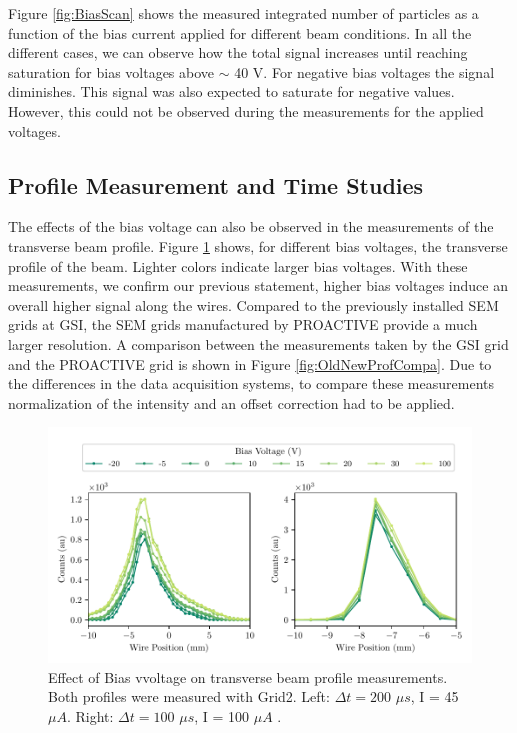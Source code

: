 Figure \ref{fig:BiasScan} shows the measured integrated number of particles as a function of the bias current applied for different beam conditions. In all the different cases, we can observe how the total signal increases until reaching saturation for bias voltages above $\sim$ 40 V. For negative bias voltages the signal diminishes. This signal was also expected to saturate for negative values. However, this could not be observed during the measurements for the applied voltages. 

\subsection{Profile Measurement and Time Studies}

The effects of the bias voltage can also be observed in the measurements of the transverse beam profile. Figure \ref{fig:BeamProfileBiasEffect} shows, for different bias voltages, the transverse profile of the beam. Lighter colors indicate larger bias voltages. With these measurements, we confirm our previous statement, higher bias voltages induce an overall higher signal along the wires. Compared to the previously installed SEM grids at GSI, the SEM grids manufactured by PROACTIVE provide a much larger resolution. A comparison between the measurements taken by the GSI grid and the PROACTIVE grid is shown in Figure \ref{fig:OldNewProfCompa}. Due to the differences in the data acquisition systems, to compare these measurements normalization of the intensity and an offset correction had to be applied.
\vspace{-0.4cm}
\begin{figure}[h]
    \centering
    \includegraphics[width=1.0\columnwidth]{BeamProfileBiasEffect/SemGridProfileBiasCompa.pdf}
    \caption{Effect of Bias vvoltage on transverse beam profile measurements. Both profiles were measured with Grid2. Left: $\Delta t = 200 $ $\mu s$, I = 45 $\mu A$. Right:  $\Delta t = 100 $ $\mu s$, I = 100 $\mu A$ . }
    \label{fig:BeamProfileBiasEffect}
\end{figure}

